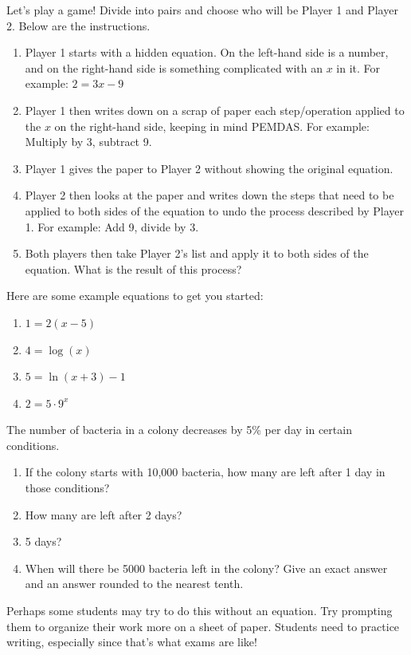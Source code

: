 \documentclass[noauthor]{ximera}
\begin{document}
\begin{problem}
Let's play a game! Divide into pairs and choose who will be
Player 1 and Player 2. Below are the instructions.

\begin{enumerate}
    \item Player 1 starts with a hidden equation. On the left-hand side
    is a number, and on the right-hand side is something complicated
    with an \(x\) in it. For example: \(2 = 3x - 9\)
    \item Player 1 then writes down on a scrap of paper each step/operation
    applied to the \(x\) on the right-hand side, keeping in mind PEMDAS.
    For example: Multiply by 3, subtract 9.
    \item Player 1 gives the paper to Player 2 without showing the original
    equation.
    \item Player 2 then looks at the paper and writes down the steps
    that need to be applied to both sides of the equation to undo
    the process described by Player 1. For example: Add 9, divide by 3.
    \item Both players then take Player 2's list and apply it to both sides
    of the equation. What is the result of this process?
\end{enumerate}

Here are some example equations to get you started:
\begin{enumerate}
    \item \(1 = 2(x - 5)\)
    \item \(4 = \log(x)\)
    \item \(5 = \ln(x + 3) - 1\)
    \item \(2 = 5 \cdot 9^x\) 
\end{enumerate}
\end{problem}

\begin{problem}
The number of bacteria in a colony decreases by 5\% per day in certain conditions.

\begin{enumerate}
    \item If the colony starts with 10,000 bacteria, how many are left
    after 1 day in those conditions?
    \item How many are left after 2 days?
    \item 5 days?
    \item When will there be 5000 bacteria left in the colony? Give an exact answer and an answer rounded to the nearest tenth. 
\end{enumerate}

\begin{instructorNotes}
Perhaps some students may try to do this without an equation. Try 
prompting them to organize their work more on a sheet of paper.
Students need to practice writing, especially since that's what exams 
are like!
\end{instructorNotes}
\end{problem}
\end{document}
